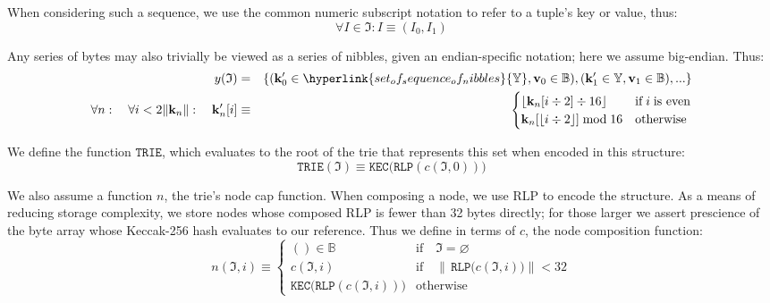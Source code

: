 \documentclass[9pt,oneside]{amsart}
\begin{document}
When considering such a sequence, we use the common numeric subscript notation to refer to a tuple's key or value, thus:
\begin{equation}
\forall I \in \mathfrak{I}: I \equiv (I_0, I_1)
\end{equation}

Any series of bytes may also trivially be viewed as a series of nibbles, given an endian-specific notation; here we assume big-endian. Thus:
\begin{eqnarray}
y(\mathfrak{I}) & = & \{ (\mathbf{k}_0' \in \hyperlink{set_of_sequence_of_nibbles}{\mathbb{Y}}, \mathbf{v}_0 \in \mathbb{B}), (\mathbf{k}_1' \in \mathbb{Y}, \mathbf{v}_1 \in \mathbb{B}), ... \} \\
\forall n: \quad \forall i < 2\lVert\mathbf{k}_{n}\rVert: \quad \mathbf{k}_{n}'[i] & \equiv &
\begin{cases}
\lfloor \mathbf{k}_{n}[i \div 2] \div 16 \rfloor & \text{if} \; i \; \text{is even} \\
\mathbf{k}_{n}[\lfloor i \div 2 \rfloor] \bmod 16 & \text{otherwise}
\end{cases}
\end{eqnarray}

We define the function $\texttt{TRIE}$, which evaluates to the root of the trie that represents this set when encoded in this structure:
\begin{equation}
\texttt{TRIE}(\mathfrak{I}) \equiv \texttt{KEC}\big(\texttt{RLP} (c(\mathfrak{I}, 0))\big)
\end{equation}

We also assume a function $n$, the trie's node cap function. When composing a node, we use RLP to encode the structure. As a means of reducing storage complexity, we store nodes whose composed RLP is fewer than 32 bytes directly; for those larger we assert prescience of the byte array whose Keccak-256 hash evaluates to our reference. Thus we define in terms of $c$, the node composition function:
\begin{equation}
n(\mathfrak{I}, i) \equiv \begin{cases}
() \in \mathbb{B} & \text{if} \quad \mathfrak{I} = \varnothing \\
c(\mathfrak{I}, i) & \text{if} \quad \lVert \, \texttt{RLP} \big( c(\mathfrak{I}, i) \big) \rVert < 32 \\
\texttt{KEC}\big(\texttt{RLP}( c(\mathfrak{I}, i)) \big) & \text{otherwise}
\end{cases}
\end{equation}
\end{document}

